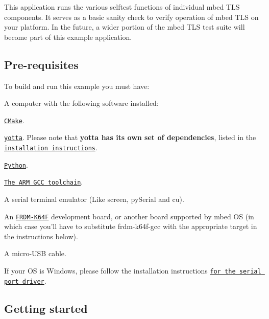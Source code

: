 This application runs the various selftest functions of individual mbed T\-L\-S components. It serves as a basic sanity check to verify operation of mbed T\-L\-S on your platform. In the future, a wider portion of the mbed T\-L\-S test suite will become part of this example application.

\subsection*{Pre-\/requisites}

To build and run this example you must have\-:
\begin{DoxyItemize}
\item A computer with the following software installed\-:
\begin{DoxyItemize}
\item \href{http://www.cmake.org/download/}{\tt C\-Make}.
\item \href{https://github.com/ARMmbed/yotta}{\tt yotta}. Please note that {\bfseries yotta has its own set of dependencies}, listed in the \href{http://armmbed.github.io/yotta/#installing-on-windows}{\tt installation instructions}.
\item \href{https://www.python.org/downloads/}{\tt Python}.
\item \href{https://launchpad.net/gcc-arm-embedded}{\tt The A\-R\-M G\-C\-C toolchain}.
\item A serial terminal emulator (Like screen, py\-Serial and cu).
\end{DoxyItemize}
\item An \href{http://developer.mbed.org/platforms/FRDM-K64F/}{\tt F\-R\-D\-M-\/\-K64\-F} development board, or another board supported by mbed O\-S (in which case you'll have to substitute frdm-\/k64f-\/gcc with the appropriate target in the instructions below).
\item A micro-\/\-U\-S\-B cable.
\item If your O\-S is Windows, please follow the installation instructions \href{https://developer.mbed.org/handbook/Windows-serial-configuration}{\tt for the serial port driver}.
\end{DoxyItemize}

\subsection*{Getting started}


